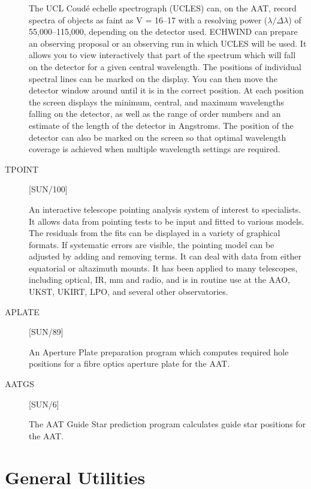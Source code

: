 \begin{description}
The UCL Coud\'{e} echelle spectrograph (UCLES) can, on the AAT, record spectra
of objects as faint as V = 16--17 with a resolving power
($\lambda/\Delta\lambda$) of 55,000--115,000, depending on the detector used.
ECHWIND can prepare an observing proposal or an observing run in which UCLES
will be used.
It allows you to view interactively that part of the spectrum which will fall
on the detector for a given central wavelength.
The positions of individual spectral lines can be marked on the display.
You can then move the detector window around until it is in the correct
position.
At each position the screen displays the minimum, central, and maximum
wavelengths falling on the detector, as well as the range of order numbers and
an estimate of the length of the detector in Angstroms.
The position of the detector can also be marked on the screen so that
optimal wavelength coverage is achieved when multiple wavelength settings are
required.

\item [TPOINT] \hfill [SUN/100]

An interactive telescope pointing analysis system of interest to specialists.
It allows data from pointing tests to be input and fitted to various models.
The residuals from the fits can be displayed in a variety of graphical formats. 
If systematic errors are visible, the pointing model can be adjusted by adding
and removing terms.
It can deal with data from either equatorial or altazimuth mounts.
It has been applied to many telescopes, including optical, IR, mm and radio,
and is in routine use at the AAO, UKST, UKIRT, LPO, and several other
observatories.

\item [APLATE] \hfill [SUN/89]

An Aperture Plate preparation program which computes required hole positions
for a fibre optics aperture plate for the AAT.

\item [AATGS] \hfill [SUN/6]

The AAT Guide Star prediction program calculates guide star positions for the 
AAT.

\end{description}

\newpage

\section{General Utilities}

